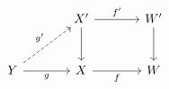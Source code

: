 \[
\begin{tikzcd}[column sep=large,row sep=large]
  &
  X'
    \arrow[r,"f'"]
    \arrow[d]
  &
  W'
    \arrow[d]
  \\
  Y
    \arrow[r,"g"']
    \arrow[ur,dashed,"g'"]
  &
  X
    \arrow[r,"f"']
  &
  W
\end{tikzcd}
\]
